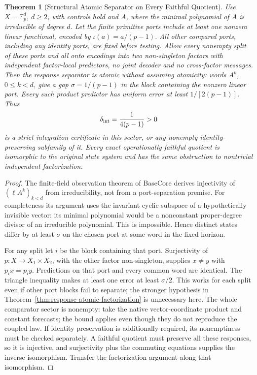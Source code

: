 \documentclass[11pt,a4paper]{article}
\newtheorem{theorem}{Theorem}[section]
\theoremstyle{definition}
\begin{document}
\begin{theorem}[Structural Atomic Separator on Every Faithful Quotient]
\label{thm:iint-irreducible-derivation}
Use $X=\mathbb F_p^d$, $d\ge2$, with controls hold and $A$, where the minimal
polynomial of $A$ is irreducible of degree $d$. Let the finite primitive
ports include at least one nonzero linear functional, encoded by
$\iota(a)=a/(p-1)$. All other compared ports, including any identity ports,
are fixed before testing. Allow every nonempty split of these ports and
all onto encodings into two non-singleton factors with independent
factor-local predictors, no joint decoder and no cross-factor messages.
Then the response separator is atomic without assuming atomicity:
words $A^k$, $0\le k<d$, give a gap $\sigma=1/(p-1)$ in the block containing
the nonzero linear port. Every such product predictor has uniform error
at least $1/[2(p-1)]$. Thus
\[
 \delta_{\rm int}=\frac1{4(p-1)}>0
\]
is a strict integration certificate in this sector, or any nonempty
identity-preserving subfamily of it. Every exact operationally faithful
quotient is isomorphic to the original state system and has the same
obstruction to nontrivial independent factorization.
\end{theorem}
\begin{proof}
The finite-field observation theorem of BaseCore derives injectivity of
$(\ell A^k)_{k<d}$ from irreducibility, not from a port-separation premise.
For completeness its argument uses the invariant cyclic subspace of a
hypothetically invisible vector: its minimal polynomial would be a
nonconstant proper-degree divisor of an irreducible polynomial. This is
impossible. Hence distinct states differ by at least $\sigma$ on the chosen
port at some word in the fixed horizon.

For any split let $i$ be the block containing that port. Surjectivity of
$p:X\to X_1\times X_2$, with the other factor non-singleton, supplies
$x\ne y$ with $p_i x=p_i y$. Predictions on that port and every common word
are identical. The triangle inequality makes at least one error at least
$\sigma/2$. This works for each split even if other port blocks fail to
separate; the stronger hypothesis in Theorem~\ref{thm:response-atomic-factorization}
is unnecessary here. The whole comparator sector is nonempty: take the
native vector-coordinate product and constant forecasts; the bound applies
even though they do not reproduce the coupled law. If identity preservation
is additionally required, its nonemptiness must be checked separately.
A faithful quotient must preserve all these responses, so it is injective,
and surjectivity plus the commuting equations supplies the inverse
isomorphism. Transfer the factorization argument along that isomorphism.
\end{proof}
\end{document}
